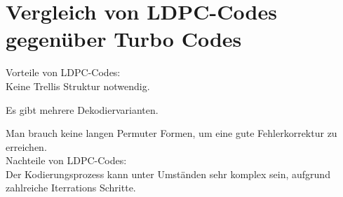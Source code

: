 \section{Vergleich von  LDPC-Codes  gegenüber Turbo Codes}
\begin{Beispiel}
Vorteile von LDPC-Codes:\\

Keine Trellis Struktur notwendig.

Es gibt mehrere Dekodiervarianten.

Man brauch keine langen Permuter Formen, um eine gute Fehlerkorrektur zu erreichen.\\

Nachteile von LDPC-Codes:\\

Der Kodierungsprozess kann unter Umständen sehr komplex sein, aufgrund zahlreiche Iterrations Schritte.
\end{Beispiel}
